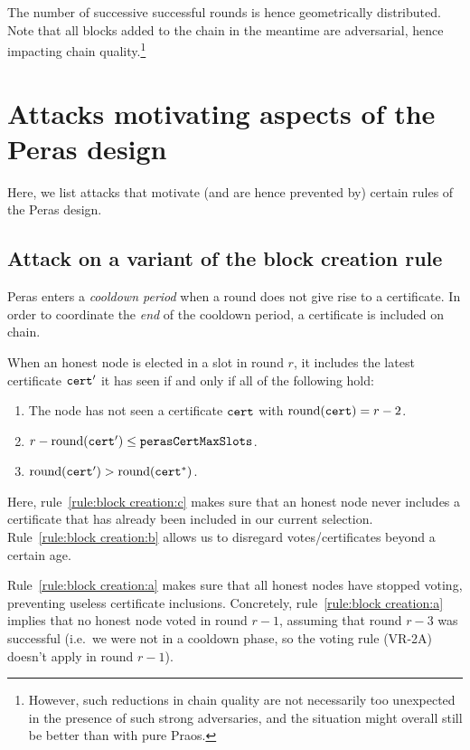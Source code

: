 \begin{enumerate}
  The number of successive successful rounds is hence geometrically distributed.
  Note that all blocks added to the chain in the meantime are adversarial, hence impacting chain quality.\footnote{However, such reductions in chain quality are not necessarily too unexpected in the presence of such strong adversaries, and the situation might overall still be better than with pure Praos.}
\end{enumerate}



\section{Attacks motivating aspects of the Peras design}

Here, we list attacks that motivate (and are hence prevented by) certain rules of the Peras design.

\subsection{Attack on a variant of the block creation rule}

Peras enters a \emph{cooldown period} when a round does not give rise to a certificate.
In order to coordinate the \emph{end} of the cooldown period, a certificate is included on chain.

When an honest node is elected in a slot in round $r$, it includes the latest certificate $\mathtt{cert}'$ it has seen if and only if all of the following hold:
\begin{enumerate}
\item\label{rule:block creation:a} The node has not seen a certificate $\mathtt{cert}$ with $\operatorname{round}(\mathtt{cert})=r-2$.
\item\label{rule:block creation:b} $r-\operatorname{round}(\mathtt{cert}') \le \mathtt{perasCertMaxSlots}$.
\item\label{rule:block creation:c} $\operatorname{round}(\mathtt{cert}') > \operatorname{round}(\mathtt{cert}^*)$.
\end{enumerate}
Here, rule~\ref{rule:block creation:c} makes sure that an honest node never includes a certificate that has already been included in our current selection.
Rule~\ref{rule:block creation:b} allows us to disregard votes/certificates beyond a certain age.

Rule~\ref{rule:block creation:a} makes sure that all honest nodes have stopped voting, preventing useless certificate inclusions.
Concretely, rule~\ref{rule:block creation:a} implies that no honest node voted in round $r-1$, assuming that round $r-3$ was successful (i.e.\ we were not in a cooldown phase, so the voting rule (VR-2A) doesn't apply in round $r-1$).

